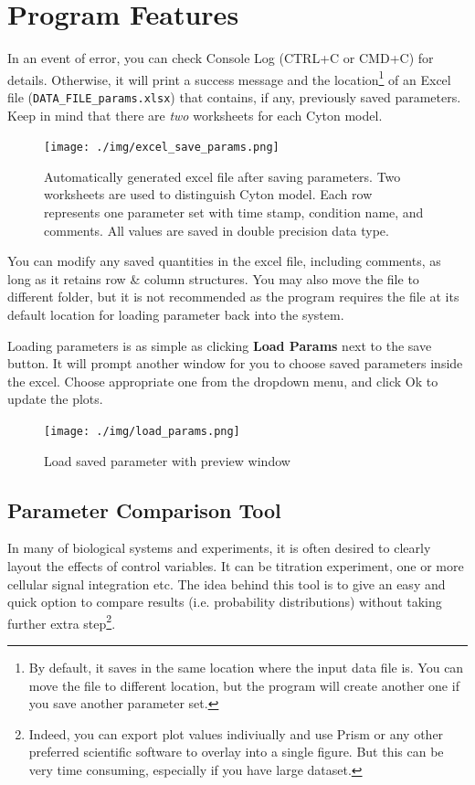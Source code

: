 \documentclass{article}
\newcommand{\enterProblemHeader}[1]{
    }
\newcommand{\exitProblemHeader}[1]{
    }
\newcounter{homeworkProblemCounter} %
\newcommand{\homeworkProblemName}{}
\newenvironment{homeworkProblem}[1][Problem \arabic{homeworkProblemCounter}]{ %
    \stepcounter{homeworkProblemCounter} %
    \renewcommand{\homeworkProblemName}{#1} %
    \section{\homeworkProblemName} %
    \enterProblemHeader{\homeworkProblemName} %
    }{
    \exitProblemHeader{\homeworkProblemName} %
    }
\begin{document}
\begin{homeworkProblem}[Program Features]
        In an event of error, you can check Console Log (CTRL+C or CMD+C) for details. Otherwise, it will print a success message and the location\footnote{By default, it saves in the same location where the input data file is. You can move the file to different location, but the program will create another one if you save another parameter set.} of an Excel file (\verb+DATA_FILE_params.xlsx+) that contains, if any, previously saved parameters. Keep in mind that there are \textit{two} worksheets for each Cyton model.
        \begin{figure}[h]
            \centering
            \texttt{[image: ./img/excel\_save\_params.png]}
            \caption{Automatically generated excel file after saving parameters. Two worksheets are used to distinguish Cyton model. Each row represents one parameter set with time stamp, condition name, and comments. All values are saved in double precision data type.}
            \label{fig:excel_save_params}
        \end{figure}

        You can modify any saved quantities in the excel file, including comments, as long as it retains row \& column structures. You may also move the file to different folder, but it is not recommended as the program requires the file at its default location for loading parameter back into the system.

        Loading parameters is as simple as clicking \textbf{Load Params} next to the save button. It will prompt another window for you to choose saved parameters inside the excel. Choose appropriate one from the dropdown menu, and click Ok to update the plots.
        \begin{figure}[h]
            \centering
            \texttt{[image: ./img/load\_params.png]}
            \caption{Load saved parameter with preview window}
            \label{fig:load_params}
        \end{figure}

        \subsection{Parameter Comparison Tool}
        In many of biological systems and experiments, it is often desired to clearly layout the effects of control variables. It can be titration experiment, one or more cellular signal integration etc. The idea behind this tool is to give an easy and quick option to compare results (i.e. probability distributions) without taking further extra step\footnote{Indeed, you can export plot values indiviually and use Prism or any other preferred scientific software to overlay into a single figure. But this can be very time consuming, especially if you have large dataset.}.


\end{homeworkProblem}
\end{document}
